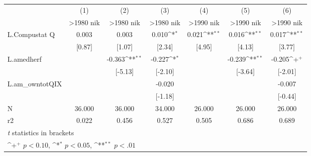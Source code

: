 {
\def\sym#1{\ifmmode^{#1}\else\(^{#1}\)\fi}
\begin{tabular}{l*{6}{c}}
\hline\hline
                    &\multicolumn{1}{c}{(1)}&\multicolumn{1}{c}{(2)}&\multicolumn{1}{c}{(3)}&\multicolumn{1}{c}{(4)}&\multicolumn{1}{c}{(5)}&\multicolumn{1}{c}{(6)}\\
                    &\multicolumn{1}{c}{>1980 nik}&\multicolumn{1}{c}{>1980 nik}&\multicolumn{1}{c}{>1980 nik}&\multicolumn{1}{c}{>1990 nik}&\multicolumn{1}{c}{>1990 nik}&\multicolumn{1}{c}{>1990 nik}\\
\hline
L.Compustat Q       &       0.003        &       0.003        &       0.010\sym{*} &       0.021\sym{**}&       0.016\sym{**}&       0.017\sym{**}\\
                    &      [0.87]        &      [1.07]        &      [2.34]        &      [4.95]        &      [4.13]        &      [3.77]        \\
L.amedherf          &                    &      -0.363\sym{**}&      -0.227\sym{*} &                    &      -0.239\sym{**}&      -0.205\sym{+} \\
                    &                    &     [-5.13]        &     [-2.10]        &                    &     [-3.64]        &     [-2.01]        \\
L.am\_owntotQIX      &                    &                    &      -0.020        &                    &                    &      -0.007        \\
                    &                    &                    &     [-1.18]        &                    &                    &     [-0.44]        \\
\hline
N                   &      36.000        &      36.000        &      34.000        &      26.000        &      26.000        &      26.000        \\
r2                  &       0.022        &       0.456        &       0.527        &       0.505        &       0.686        &       0.689        \\
\hline\hline
\multicolumn{7}{l}{\footnotesize \textit{t} statistics in brackets}\\
\multicolumn{7}{l}{\footnotesize \sym{+} \(p<0.10\), \sym{*} \(p<0.05\), \sym{**} \(p<.01\)}\\
\end{tabular}
}
